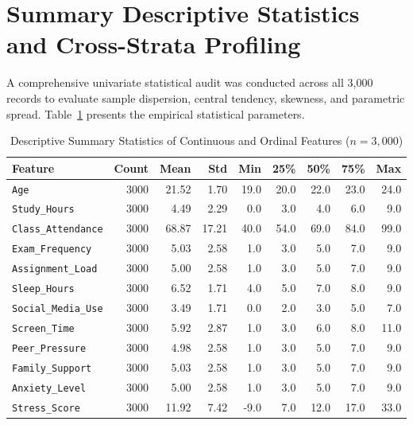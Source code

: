 \documentclass[12pt,a4paper,oneside]{report}
\begin{document}
\section{Summary Descriptive Statistics and Cross-Strata Profiling}
\label{sec:descriptive_statistics}
A comprehensive univariate statistical audit was conducted across all 3,000 records to evaluate sample dispersion, central tendency, skewness, and parametric spread. Table~\ref{tab:descriptive_stats} presents the empirical statistical parameters.

\begin{table}[H]
\centering
\caption{Descriptive Summary Statistics of Continuous and Ordinal Features ($n = 3,000$)}
\label{tab:descriptive_stats}
\small
\begin{tabularx}{\textwidth}{Xrrrrrrrr}
\toprule
\textbf{Feature} & \textbf{Count} & \textbf{Mean} & \textbf{Std} & \textbf{Min} & \textbf{25\%} & \textbf{50\%} & \textbf{75\%} & \textbf{Max} \\
\midrule
\texttt{Age} & 3000 & 21.52 & 1.70 & 19.0 & 20.0 & 22.0 & 23.0 & 24.0 \\
\texttt{Study\_Hours} & 3000 & 4.49 & 2.29 & 0.0 & 3.0 & 4.0 & 6.0 & 9.0 \\
\texttt{Class\_Attendance} & 3000 & 68.87 & 17.21 & 40.0 & 54.0 & 69.0 & 84.0 & 99.0 \\
\texttt{Exam\_Frequency} & 3000 & 5.03 & 2.58 & 1.0 & 3.0 & 5.0 & 7.0 & 9.0 \\
\texttt{Assignment\_Load} & 3000 & 5.00 & 2.58 & 1.0 & 3.0 & 5.0 & 7.0 & 9.0 \\
\texttt{Sleep\_Hours} & 3000 & 6.52 & 1.71 & 4.0 & 5.0 & 7.0 & 8.0 & 9.0 \\
\texttt{Social\_Media\_Use} & 3000 & 3.49 & 1.71 & 0.0 & 2.0 & 3.0 & 5.0 & 7.0 \\
\texttt{Screen\_Time} & 3000 & 5.92 & 2.87 & 1.0 & 3.0 & 6.0 & 8.0 & 11.0 \\
\texttt{Peer\_Pressure} & 3000 & 4.98 & 2.58 & 1.0 & 3.0 & 5.0 & 7.0 & 9.0 \\
\texttt{Family\_Support} & 3000 & 5.03 & 2.58 & 1.0 & 3.0 & 5.0 & 7.0 & 9.0 \\
\texttt{Anxiety\_Level} & 3000 & 5.00 & 2.58 & 1.0 & 3.0 & 5.0 & 7.0 & 9.0 \\
\texttt{Stress\_Score} & 3000 & 11.92 & 7.42 & -9.0 & 7.0 & 12.0 & 17.0 & 33.0 \\
\bottomrule
\end{tabularx}
\end{table}
\end{document}
